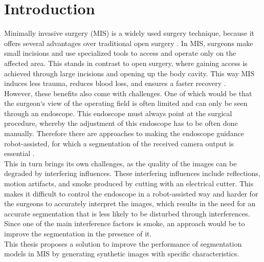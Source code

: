 

\chapter{Introduction}
Minimally invasive surgery (MIS) is a widely used surgery technique, because it offers several advantages over traditional open surgery \cite{mohiuddin2013maximizing}. 
In MIS, surgeons make small incisions and use specialized tools to access and operate only on the affected area.
This stands in contrast to open surgery, where gaining access is achieved through large incisions and opening up the body cavity.
This way MIS induces less trauma, reduces blood loss, and ensures a faster recovery \cite{mohiuddin2013maximizing}.\\
However, these benefits also come with challenges.
One of which would be that the surgeon`s view of the operating field is often limited and can only be seen through an endoscope.
This endoscope must always point at the surgical procedure, whereby the adjustment of this endoscope has to be often done manually.
Therefore there are approaches to making the endoscope guidance robot-assisted, for which a segmentation of the received camera output is essential \cite{gruijthuijsen2022robotic}.\\
This in turn brings its own challenges, as the quality of the images can be degraded by interfering influences.
These interfering influences include reflections, motion artifacts, and smoke produced by cutting with an electrical cutter.
This makes it difficult to control the endoscope in a robot-assisted way and harder for the surgeons to accurately interpret the images, which results in the need for an accurate segmentation that is less likely to be disturbed through interferences.
Since one of the main interference factors is smoke, an approach would be to improve the segmentation in the presence of it.\\
This thesis proposes a solution to improve the performance of segmentation models in MIS by generating synthetic images with specific characteristics.
